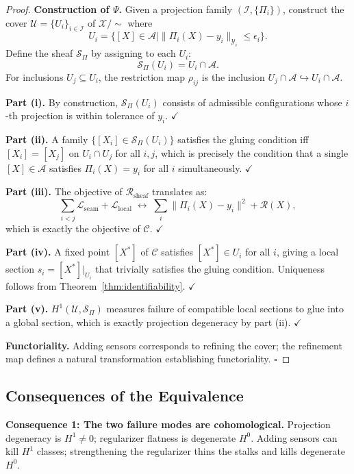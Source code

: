 \documentclass[11pt, oneside]{article}
\newcommand{\Xmod}{\mathcal{X}/{\sim}}
\begin{document}
\begin{proof}
\textbf{Construction of $\Psi$.} Given a projection family
$(\mathcal{I}, \{\Pi_i\})$, construct the cover
$\mathcal{U} = \{U_i\}_{i \in \mathcal{I}}$ of $\Xmod$ where
\[
U_i = \{ [X] \in \mathcal{A} \mid \|\Pi_i(X) - y_i\|_{\mathcal{Y}_i} \le \epsilon_i \}.
\]
Define the sheaf $\mathcal{S}_\Pi$ by assigning to each $U_i$:
\[
\mathcal{S}_\Pi(U_i) = U_i \cap \mathcal{A}.
\]
For inclusions $U_j \subseteq U_i$, the restriction map $\rho_{ij}$ is the inclusion
$U_j \cap \mathcal{A} \hookrightarrow U_i \cap \mathcal{A}$.

\textbf{Part (i).} By construction, $\mathcal{S}_\Pi(U_i)$ consists of admissible
configurations whose $i$-th projection is within tolerance of $y_i$. $\checkmark$

\textbf{Part (ii).} A family $\{[X_i] \in \mathcal{S}_\Pi(U_i)\}$ satisfies the gluing
condition iff $[X_i] = [X_j]$ on $U_i \cap U_j$ for all $i,j$, which is precisely the
condition that a single $[X] \in \mathcal{A}$ satisfies $\Pi_i(X) = y_i$ for all $i$
simultaneously. $\checkmark$

\textbf{Part (iii).} The objective of $\mathcal{R}_{\mathrm{sheaf}}$ translates as:
\[
\sum_{i<j} \mathcal{L}_{\mathrm{seam}} + \mathcal{L}_{\mathrm{local}}
\;\longleftrightarrow\;
\sum_i \|\Pi_i(X) - y_i\|^2 + \mathcal{R}(X),
\]
which is exactly the objective of $\mathcal{C}$. $\checkmark$

\textbf{Part (iv).} A fixed point $[X^*]$ of $\mathcal{C}$ satisfies
$[X^*] \in U_i$ for all $i$, giving a local section $s_i = [X^*]|_{U_i}$ that trivially
satisfies the gluing condition. Uniqueness follows from Theorem~\ref{thm:identifiability}.
$\checkmark$

\textbf{Part (v).} $H^1(\mathcal{U}, \mathcal{S}_\Pi)$ measures failure of compatible
local sections to glue into a global section, which is exactly projection degeneracy by
part (ii). $\checkmark$

\textbf{Functoriality.} Adding sensors corresponds to refining the cover; the refinement
map defines a natural transformation establishing functoriality. $\square$
\end{proof}

\subsection{Consequences of the Equivalence}

\textbf{Consequence 1: The two failure modes are cohomological.} Projection degeneracy is
$H^1 \ne 0$; regularizer flatness is degenerate $H^0$. Adding sensors can kill $H^1$
classes; strengthening the regularizer thins the stalks and kills degenerate $H^0$.
\end{document}
